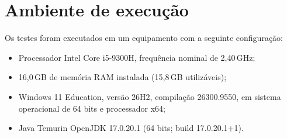 \section{Ambiente de execução}

Os testes foram executados em um equipamento com a seguinte configuração:

\begin{itemize}
  \item Processador Intel Core i5-9300H, frequência nominal de 2,40\,GHz;
  \item 16,0\,GB de memória RAM instalada (15,8\,GB utilizáveis);
  \item Windows 11 Education, versão 26H2, compilação 26300.9550, em sistema operacional de 64 bits e processador x64;
  \item Java Temurin OpenJDK 17.0.20.1 (64 bits; build 17.0.20.1+1).
\end{itemize}
